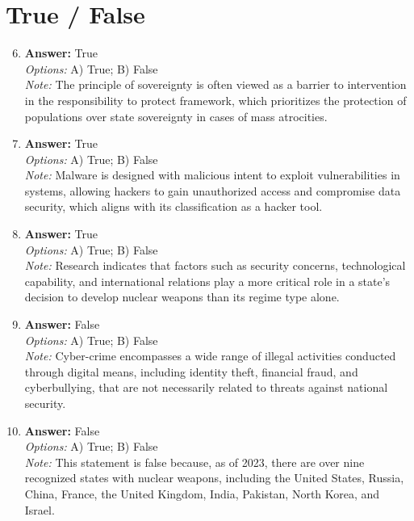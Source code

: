 \documentclass[12pt]{article}
\begin{document}
\section*{True / False}
\begin{enumerate}[label=\arabic*.]
\setcounter{enumi}{5}
\item \textbf{Answer:} True
\\ \textit{Options:} A) True; B) False
\\ \textit{Note:} The principle of sovereignty is often viewed as a barrier to intervention in the responsibility to protect framework, which prioritizes the protection of populations over state sovereignty in cases of mass atrocities.
\item \textbf{Answer:} True
\\ \textit{Options:} A) True; B) False
\\ \textit{Note:} Malware is designed with malicious intent to exploit vulnerabilities in systems, allowing hackers to gain unauthorized access and compromise data security, which aligns with its classification as a hacker tool.
\item \textbf{Answer:} True
\\ \textit{Options:} A) True; B) False
\\ \textit{Note:} Research indicates that factors such as security concerns, technological capability, and international relations play a more critical role in a state's decision to develop nuclear weapons than its regime type alone.
\item \textbf{Answer:} False
\\ \textit{Options:} A) True; B) False
\\ \textit{Note:} Cyber-crime encompasses a wide range of illegal activities conducted through digital means, including identity theft, financial fraud, and cyberbullying, that are not necessarily related to threats against national security.
\item \textbf{Answer:} False
\\ \textit{Options:} A) True; B) False
\\ \textit{Note:} This statement is false because, as of 2023, there are over nine recognized states with nuclear weapons, including the United States, Russia, China, France, the United Kingdom, India, Pakistan, North Korea, and Israel.
\end{enumerate}
\end{document}

